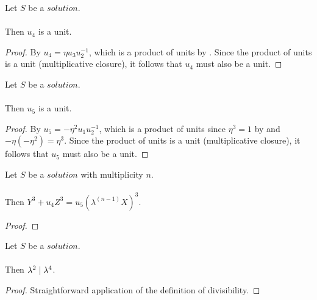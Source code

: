 \begin{lemma}
    \label{lmm:u₄_isUnit}
    \leanok
    Let $S$ be a $solution$.\\\\
    Then $u_4$ is a unit.
\end{lemma}
\begin{proof}
    \leanok
    By  $u_4 = \eta u_3 u_2^{-1}$,
    which is a product of units by .
    Since the product of units is a unit (multiplicative closure),
    it follows that $u_4$ must also be a unit.
\end{proof}

\begin{lemma}
    \label{lmm:u₅_isUnit}
    \leanok
    Let $S$ be a $solution$.\\\\
    Then $u_5$ is a unit.
\end{lemma}
\begin{proof}
    \leanok
    By  $u_5 = -\eta^2 u_1 u_2^{-1}$,
    which is a product of units since $\eta^3 = 1$ by  and
    $-\eta (-\eta^2) = \eta^3$.
    Since the product of units is a unit (multiplicative closure),
    it follows that $u_5$ must also be a unit.
\end{proof}

\begin{lemma}
    \label{lmm:formula2}
    \leanok
    Let $S$ be a $solution$ with multiplicity $n$.\\\\
    Then $Y^3 + u_4 Z^3 = u_5 (\lambda^(n-1) X)^3$.
\end{lemma}
\begin{proof}
    \leanok
\end{proof}

\begin{lemma}
    \label{lmm:lambda_sq_div_lambda_fourth}
    \leanok
    Let $S$ be a $solution$.\\\\
    Then $\lambda^2 \mid \lambda^4$.
\end{lemma}
\begin{proof}
    \leanok
    Straightforward application of the definition of divisibility.
\end{proof}

